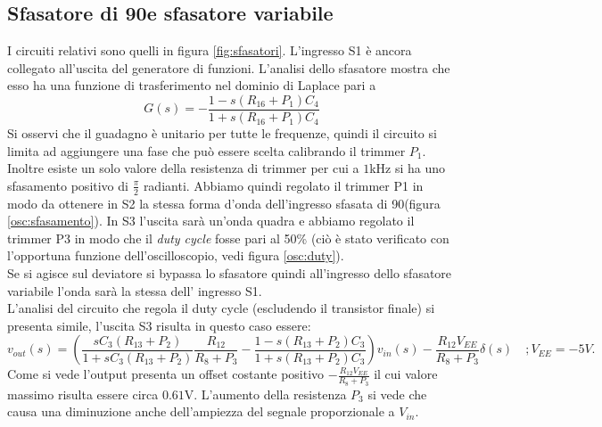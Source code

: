 \documentclass[10pt,a4paper]{article}
\begin{document}
\newpage

\subsection{Sfasatore di 90\degree e sfasatore variabile}
I circuiti relativi sono quelli in figura \ref{fig:sfasatori}. L'ingresso S1 è ancora collegato all'uscita del generatore di funzioni.
L'analisi dello sfasatore mostra che esso ha una funzione di trasferimento nel dominio di Laplace pari a
\begin{equation}
 G(s) = -\frac{1-s(R_{16} +P_1) C_{4}}{1+s(R_{16} + P_1)C_{4}}
\end{equation}
Si osservi che il guadagno è unitario per tutte le frequenze, quindi il circuito si limita ad aggiungere una fase che può essere scelta calibrando il trimmer $P_1$. Inoltre esiste un solo valore della resistenza di trimmer per cui a $1$kHz si ha uno sfasamento positivo di $\frac{\pi}{2}$ radianti. Abbiamo quindi regolato il trimmer P1 in modo da ottenere in S2 la stessa forma d'onda dell'ingresso sfasata di 90\degree (figura \ref{osc:sfasamento}). In S3 l'uscita sarà un'onda quadra e abbiamo regolato il trimmer P3 in modo che il \emph{duty cycle} fosse pari al 50\% (ciò è stato verificato con l'opportuna funzione dell'oscilloscopio, vedi figura \ref{osc:duty}).\\
Se si agisce sul deviatore si bypassa lo sfasatore quindi all'ingresso dello sfasatore variabile l'onda sarà la stessa dell' ingresso S1.\\
L'analisi del circuito che regola il duty cycle (escludendo il transistor finale) si presenta simile, l'uscita S3 risulta in questo caso essere:
\begin{equation}
v_{out}(s) = \left( \frac{s C_3 (R_{13} + P_2)}{1 + s C_3 (R_{13} + P_2)} \frac{R_{12}}{R_8+P_3} -\frac{1-s(R_{13} +P_2) C_{3}}{1+s(R_{13} + P_2)C_{3}} \right) v_{in}(s)-\frac{R_{12} V_{EE}}{R_8+P_3} \delta (s)
\, \, \, \, \, \, ; V_{EE} = -5V.
\end{equation}
Come si vede l'output presenta un offset costante positivo $-\frac{R_{12} V_{EE}}{R_8+P_3}$ il cui valore massimo risulta essere circa $0.61$V. L'aumento della resistenza $P_3$ si vede che causa una diminuzione anche dell'ampiezza del segnale proporzionale a $V_{in}$. 
\end{document}
